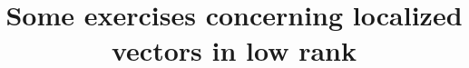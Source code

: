 \documentclass[reqno]{amsart} 
\title{Some exercises concerning localized vectors in low rank}
\begin{document}
{} 
\end{document}
